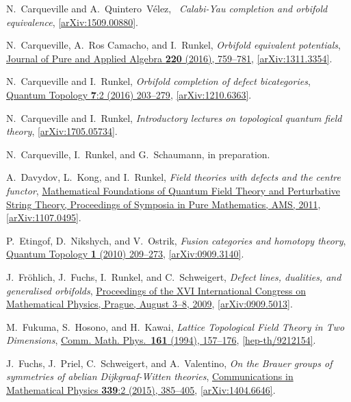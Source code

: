 \documentclass[12pt]{scrartcl}
\newcommand\arxiv[2]      {\href{http://arXiv.org/abs/#1}{#2}}
\newcommand\doi[2]        {\href{http://dx.doi.org/#1}{#2}}
\theoremstyle{definition}
\numberwithin{equation}{section}
\numberwithin{definition}{section}
\numberwithin{figure}{section}
\begin{document}
\begin{thebibliography}{BDSPV}
N.~Carqueville and A.~Quintero~V\'elez, \
\textsl{Calabi-Yau completion and orbifold equivalence}, 
\href{http://arxiv.org/abs/1509.00880}{[arXiv:1509.00880]}.

N.~Carqueville, A.~Ros Camacho, and I.~Runkel, 
\textsl{Orbifold equivalent potentials}, 
\doi{10.1016/j.jpaa.2015.07.015}{Journal of Pure and Applied Algebra \textbf{220} (2016), 759--781}, 
\arxiv{1311.3354}{[arXiv:1311.3354]}.

N.~Carqueville and I.~Runkel, 
\textsl{Orbifold completion of defect bicategories}, 
\doi{10.4171/QT/76}{Quantum Topology \textbf{7}:2 (2016) 203--279}, 
\href{http://arxiv.org/abs/1210.6363}{[arXiv:1210.6363]}.

N.~Carqueville and I.~Runkel, 
\textsl{Introductory lectures on topological quantum field theory}, 
\href{http://arxiv.org/abs/1705.05734}{[arXiv:1705.05734]}.

N.~Carqueville, I.~Runkel, and G.~Schaumann, 
in preparation.

A.~Davydov, L.~Kong, and I.~Runkel, 
\textsl{Field theories with defects and the centre functor}, 
\href{http://www.ams.org/bookstore?fn=20&arg1=pspumseries&ikey=PSPUM-83}{Mathematical Foundations of Quantum Field Theory and Perturbative String Theory, Proceedings of Symposia in Pure Mathematics, AMS, 2011}, \href{http://arxiv.org/abs/1107.0495}{[arXiv:1107.0495]}. 

P.~Etingof, D.~Nikshych, and V.~Ostrik, 
\textsl{Fusion categories and homotopy theory}, 
\doi{10.4171/QT/6}{Quantum Topology \textbf{1} (2010) 209--273},
\href{http://www.arxiv.org/abs/0909.3140}{[arXiv:0909.3140]}.

J.~Fr\"ohlich, J.~Fuchs, I.~Runkel, and C.~Schweigert,
\textsl{Defect lines, dualities, and generalised orbifolds}, 
\doi{10.1142/9789814304634_0056}{Proceedings of the XVI International Congress on Mathematical Physics, Prague, August 3--8, 2009}, \href{http://arxiv.org/abs/0909.5013}{[arXiv:0909.5013]}.

M.~Fukuma, S.~Hosono, and H.~Kawai, 
\textsl{Lattice Topological Field Theory in Two Dimensions}, 
\doi{10.1007/BF02099416}{Comm. Math. Phys.~\textbf{161} (1994), 157--176},
\href{http://www.arxiv.org/abs/hep-th/9212154}{[hep-th/9212154]}.

J.~Fuchs, J.~Priel, C.~Schweigert, and A.~Valentino,
\textsl{On the Brauer groups of symmetries of abelian Dijkgraaf-Witten theories}, 
\doi{10.1007/s00220-015-2420-y}{Communications in Mathematical Physics \textbf{339}:2 (2015), 385--405}, 
\href{http://arxiv.org/abs/1404.6646}{[arXiv:1404.6646]}.


\end{thebibliography}
\end{document}
